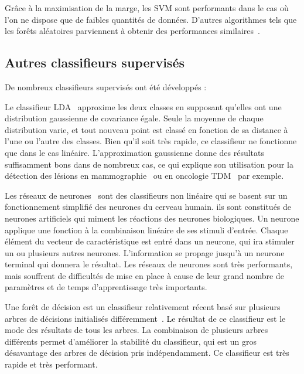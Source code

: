 Grâce à la maximisation de la marge, les SVM sont performants dans le cas où l'on ne dispose que de faibles quantités de données. D'autres algorithmes tels que les forêts aléatoires parviennent à obtenir des performances similaires~\cite{statnikov2008comprehensive}.

\subsection{Autres classifieurs supervisés}

De nombreux classifieurs supervisés ont été développés :

\label{lab:LDA}
Le classifieur LDA~\cite{fisher1936use} approxime les deux classes en supposant qu'elles ont une distribution gaussienne de covariance égale. Seule la moyenne de chaque distribution varie, et tout nouveau point est classé en fonction de sa distance à l'une ou l'autre des classes. Bien qu'il soit très rapide, ce classifieur ne fonctionne que dans le cas linéaire. L'approximation gaussienne donne des résultats suffisamment bons dans de nombreux cas, ce qui explique son utilisation pour la détection des lésions en mammographie~\cite{baydush2007incorporation} ou en oncologie TDM~\cite{gurcan2002lung} par exemple.


Les réseaux de neurones~\cite{haykin1999neural} sont des classifieurs non linéaire qui se basent sur un fonctionnement simplifié des neurones du cerveau humain. ils sont constitués de neurones artificiels qui miment les réactions des neurones biologiques. Un neurone applique une fonction à la combinaison linéaire de ses stimuli d'entrée. Chaque élément du vecteur de caractéristique est entré dans un neurone, qui ira stimuler un ou plusieurs autres neurones. L'information se propage jusqu'à un neurone terminal qui donnera le résultat. Les réseaux de neurones sont très performants, mais souffrent de difficultés de mise en place à cause de leur grand nombre de paramètres et de temps d'apprentissage très importants.

Une forêt de décision est un classifieur relativement récent basé sur plusieurs arbres de décisions initialisés différemment~\cite{ho1998random}. Le résultat de ce classifieur est le mode des résultats de tous les arbres. La combinaison de plusieurs arbres différents permet d'améliorer la stabilité du classifieur, qui est un gros désavantage des arbres de décision pris indépendamment. Ce classifieur est très rapide et très performant.

